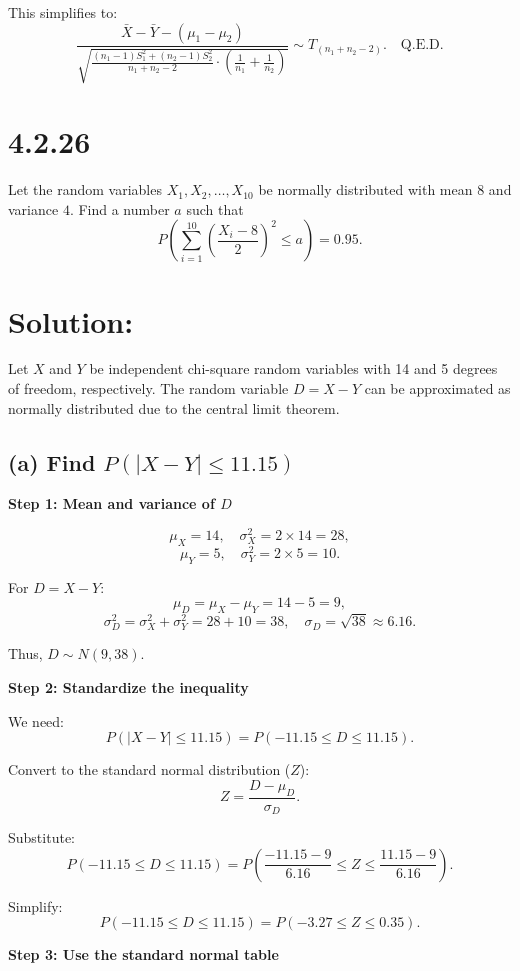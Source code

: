 \documentclass{article}
\begin{document}
This simplifies to:
\[
\frac{\bar{X} - \bar{Y} - (\mu_1 - \mu_2)}{\sqrt{\frac{(n_1 - 1)S_1^2 + (n_2 - 1)S_2^2}{n_1 + n_2 - 2} \cdot \left(\frac{1}{n_1} + \frac{1}{n_2}\right)}} \sim T_{(n_1 + n_2 - 2)}. \quad \text{Q.E.D.}
\]


\section*{4.2.26}

Let the random variables $X_1, X_2, \dots, X_{10}$ be normally distributed with mean $8$ and variance $4$. Find a number $a$ such that
\[
P\left( \sum_{i=1}^{10} \left(\frac{X_i - 8}{2}\right)^2 \leq a \right) = 0.95.
\]

\section*{Solution:}

Let $X$ and $Y$ be independent chi-square random variables with 14 and 5 degrees of freedom, respectively. The random variable $D = X - Y$ can be approximated as normally distributed due to the central limit theorem.

\subsection*{(a) Find $P(|X - Y| \leq 11.15)$}

\textbf{Step 1: Mean and variance of $D$}

\[
\mu_X = 14, \quad \sigma_X^2 = 2 \times 14 = 28,
\]
\[
\mu_Y = 5, \quad \sigma_Y^2 = 2 \times 5 = 10.
\]

For $D = X - Y$:
\[
\mu_D = \mu_X - \mu_Y = 14 - 5 = 9,
\]
\[
\sigma_D^2 = \sigma_X^2 + \sigma_Y^2 = 28 + 10 = 38, \quad \sigma_D = \sqrt{38} \approx 6.16.
\]

Thus, $D \sim N(9, 38)$.

\textbf{Step 2: Standardize the inequality}

We need:
\[
P(|X - Y| \leq 11.15) = P(-11.15 \leq D \leq 11.15).
\]

Convert to the standard normal distribution ($Z$):
\[
Z = \frac{D - \mu_D}{\sigma_D}.
\]

Substitute:
\[
P(-11.15 \leq D \leq 11.15) = P\left(\frac{-11.15 - 9}{6.16} \leq Z \leq \frac{11.15 - 9}{6.16}\right).
\]

Simplify:
\[
P(-11.15 \leq D \leq 11.15) = P(-3.27 \leq Z \leq 0.35).
\]

\textbf{Step 3: Use the standard normal table}
\end{document}
